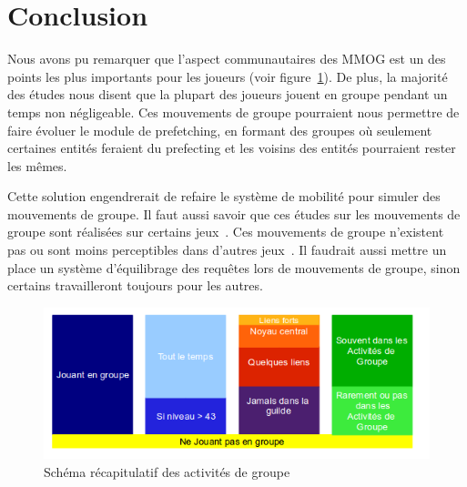 \documentclass[11pt,a4paper]{article}
\begin{document}
\section{Conclusion}
Nous avons pu remarquer que l'aspect communautaires des MMOG est un des points les plus importants pour les joueurs (voir figure~\ref{recapstat}). De plus, la majorité des études nous disent que la plupart des joueurs jouent en groupe pendant un temps non négligeable. Ces mouvements de groupe pourraient nous permettre de faire évoluer le module de prefetching, en formant des groupes où seulement certaines entités feraient du prefecting et les voisins des entités pourraient rester les mêmes.
\par Cette solution engendrerait de refaire le système de mobilité pour simuler des mouvements de groupe. Il faut aussi savoir que ces études sur les mouvements de groupe sont réalisées sur certains jeux~\cite{wow,everquest}. Ces mouvements de groupe n'existent pas ou sont moins perceptibles dans d'autres jeux~\cite{sl}. Il faudrait aussi mettre un place un système d'équilibrage des requêtes lors de mouvements de groupe, sinon certains travailleront toujours pour les autres.

	\vspace{5cm}
	\begin{figure}[!h]
        \centering
        \includegraphics[scale=0.65]{./images/recapstat.png}
        \caption{Schéma récapitulatif des activités de groupe}
        \label{recapstat}
        \end{figure}

\newpage




 
\end{document}

